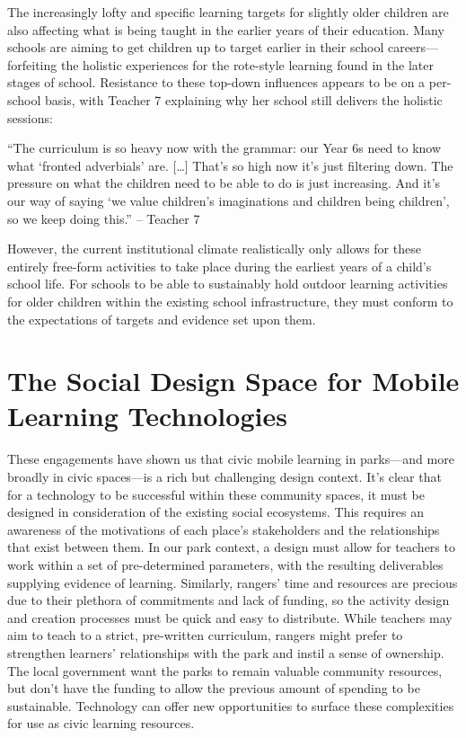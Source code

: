 The increasingly lofty and specific learning targets for slightly older children are also affecting what is being taught in the earlier years of their education. Many schools are aiming to get children up to target earlier in their school careers---forfeiting the holistic experiences for the rote-style learning found in the later stages of school. Resistance to these top-down influences appears to be on a per-school basis, with Teacher 7 explaining why her school still delivers the holistic sessions:

\begin{displayquote}
“The curriculum is so heavy now with the grammar: our Year 6s need to know what `fronted adverbials' are. […] That's so high now it’s just filtering down. The pressure on what the children need to be able to do is just increasing. And it's our way of saying `we value children’s imaginations and children being children', so we keep doing this.” – Teacher 7 
\end{displayquote}

However, the current institutional climate realistically only allows for these entirely free-form activities to take place during the earliest years of a child’s school life. For schools to be able to sustainably hold outdoor learning activities for older children within the existing school infrastructure, they must conform to the expectations of targets and evidence set upon them.

\section{The Social Design Space for Mobile Learning Technologies}

These engagements have shown us that civic mobile learning in parks---and more broadly in civic spaces---is a rich but challenging design context. It's clear that for a technology to be successful within these community spaces, it must be designed in consideration of the existing social ecosystems. This requires an awareness of the motivations of each place’s stakeholders and the relationships that exist between them. In our park context, a design must allow for teachers to work within a set of pre-determined parameters, with the resulting deliverables supplying evidence of learning. Similarly, rangers’ time and resources are precious due to their plethora of commitments and lack of funding, so the activity design and creation processes must be quick and easy to distribute. While teachers may aim to teach to a strict, pre-written curriculum, rangers might prefer to strengthen learners’ relationships with the park and instil a sense of ownership. The local government want the parks to remain valuable community resources, but don’t have the funding to allow the previous amount of spending to be sustainable. Technology can offer new opportunities to surface these complexities for use as civic learning resources.

